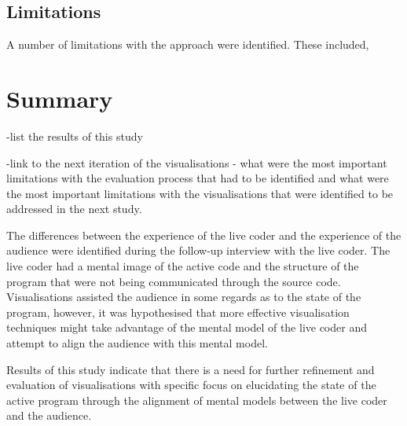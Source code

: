 \subsection{Limitations}

A number of limitations with the approach were identified. These included, \more

\section{Summary}

-list the results of this study

-link to the next iteration of the visualisations - what were the most important limitations with the evaluation process that had to be identified and what were the most important limitations with the visualisations that were identified to be addressed in the next study.

The differences between the experience of the live coder and the experience of the audience were identified during the follow-up interview with the live coder. The live coder had a mental image of the active code and the structure of the program that were not being communicated through the source code. Visualisations assisted the audience in some regards as to the state of the program, however, it was hypothesised that more effective visualisation techniques might take advantage of the mental model of the live coder and attempt to align the audience with this mental model.

Results of this study indicate that there is a need for further refinement and evaluation of visualisations with specific focus on elucidating the state of the active program through the alignment of mental models between the live coder and the audience.





